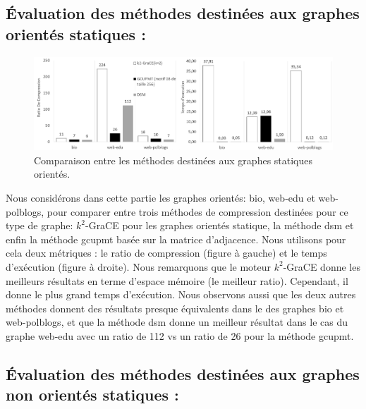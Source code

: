 	\subsection{Évaluation des méthodes destinées aux graphes orientés statiques :}
\begin{figure}[H]
		\begin{center}
		 \includegraphics[scale=0.4]{ressources/image/compNon.png}
			
			
			\caption{Comparaison entre les méthodes destinées aux graphes statiques orientés.}
			\label{fig:comp-dyn}
		\end{center}
	\end{figure}	
	
	Nous considérons dans cette partie les graphes orientés: bio, web-edu et web-polblogs, pour comparer entre trois méthodes de compression destinées pour ce type de graphe: $k^2$-GraCE pour les graphes orientés statique, la méthode \gls{dsm} et enfin la méthode \gls{gcupmt} basée sur la matrice d'adjacence. Nous utilisons pour cela deux métriques : le ratio de compression (figure à gauche) et le temps d'exécution (figure à droite). Nous remarquons que le moteur $k^2$-GraCE donne les meilleurs résultats en terme d'espace mémoire (le meilleur ratio). Cependant, il donne le plus grand temps d'exécution. Nous observons aussi que les deux autres méthodes donnent des résultats presque équivalents dans le des graphes bio et web-polblogs, et que la méthode \gls{dsm} donne un meilleur résultat dans le cas du graphe web-edu avec un ratio de 112 vs un ratio de 26 pour la méthode \gls{gcupmt}. 
	
	\subsection{Évaluation des méthodes destinées aux graphes non orientés statiques :}
	
